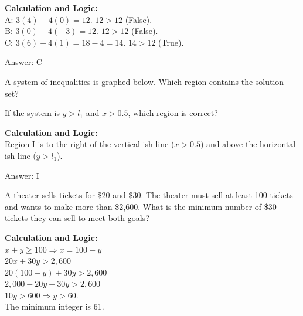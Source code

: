 \documentclass[11pt,paper=a4,answers]{exam}
\begin{document}
\begin{questions}
\begin{solution}
\textbf{Calculation and Logic:} \\
A: $3(4) - 4(0) = 12$. $12 > 12$ (False). \\
B: $3(0) - 4(-3) = 12$. $12 > 12$ (False). \\
C: $3(6) - 4(1) = 18 - 4 = 14$. $14 > 12$ (True).

\vspace{15pt}
Answer: \colorbox{yellow!100}{C}
\end{solution}

\question
A system of inequalities is graphed below. Which region contains the solution set?

\begin{center}
\end{center}

If the system is $y > l_1$ and $x > 0.5$, which region is correct?

\begin{solution}
\textbf{Calculation and Logic:} \\
Region I is to the right of the vertical-ish line ($x > 0.5$) and above the horizontal-ish line ($y > l_1$).

\vspace{15pt}
Answer: \colorbox{yellow!100}{I}
\end{solution}

\question
A theater sells tickets for \$20 and \$30. The theater must sell at least 100 tickets and wants to make more than \$2,600. What is the minimum number of \$30 tickets they can sell to meet both goals?

\begin{solution}
\textbf{Calculation and Logic:} \\
$x + y \ge 100 \Rightarrow x = 100 - y$ \\
$20x + 30y > 2,600$ \\
$20(100 - y) + 30y > 2,600$ \\
$2,000 - 20y + 30y > 2,600$ \\
$10y > 600 \Rightarrow y > 60$. \\
The minimum integer is 61.


\end{solution}
\end{questions}
\end{document}
